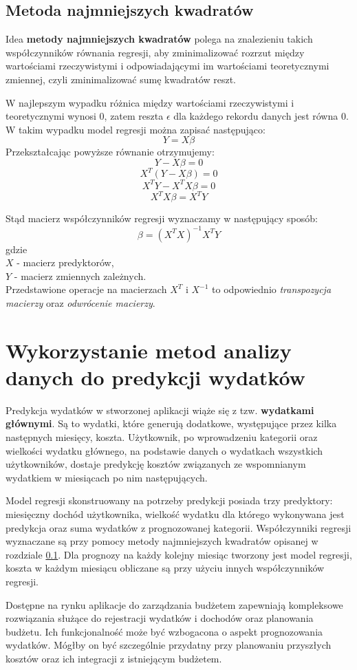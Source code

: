\subsection{Metoda najmniejszych kwadratów}\label{najmniejsze_kwadraty}
Idea \textbf{metody najmniejszych kwadratów} polega na znalezieniu takich współczynników równania regresji, aby zminimalizować rozrzut między wartościami rzeczywistymi i odpowiadającymi im wartościami teoretycznymi zmiennej, czyli zminimalizować sumę kwadratów reszt.\cite{bptstatystyka}

W najlepszym wypadku różnica między wartościami rzeczywistymi i teoretycznymi wynosi 0, zatem reszta \(\epsilon\) dla każdego rekordu danych jest równa 0. W takim wypadku model regresji można zapisać następująco: 
\[Y = X\beta\]
Przekształcając powyższe równanie otrzymujemy:
\[Y - X\beta = 0\]
\[X^T(Y - X\beta) = 0 \]
\[X^TY - X^TX\beta = 0 \]
\[X^TX\beta = X^TY\]

Stąd macierz współczynników regresji wyznaczamy w następujący sposób:
\[\beta = (X^TX)^{-1}X^TY\]
gdzie\\
\(X\) - macierz predyktorów,\\
\(Y\) - macierz zmiennych zależnych.\cite{martinabremer2012}\\
Przedstawione operacje na macierzach \(X^T\) i \(X^{-1}\) to odpowiednio \textit{transpozycja macierzy} oraz \textit{odwrócenie macierzy}.

\section{Wykorzystanie metod analizy danych do predykcji wydatków}
Predykcja wydatków w stworzonej aplikacji wiąże się z tzw. \textbf{wydatkami głównymi}. Są to wydatki, które generują dodatkowe, występujące przez kilka następnych miesięcy, koszta. Użytkownik, po wprowadzeniu kategorii oraz wielkości wydatku głównego, na podstawie danych o wydatkach wszystkich użytkowników, dostaje predykcję kosztów związanych ze wspomnianym wydatkiem w miesiącach po nim następujących.

Model regresji skonstruowany na potrzeby predykcji posiada trzy predyktory: miesięczny dochód użytkownika, wielkość wydatku dla którego wykonywana jest predykcja oraz suma wydatków z prognozowanej kategorii. Współczynniki regresji wyznaczane są przy pomocy metody najmniejszych kwadratów opisanej w rozdziale \ref{najmniejsze_kwadraty}. Dla prognozy na każdy kolejny miesiąc tworzony jest model regresji, koszta w każdym miesiącu obliczane są przy użyciu innych współczynników regresji.

Dostępne na rynku aplikacje do zarządzania budżetem zapewniają kompleksowe rozwiązania służące do rejestracji wydatków i dochodów oraz planowania budżetu. Ich funkcjonalność może być wzbogacona o aspekt prognozowania wydatków. Mógłby on być szczególnie przydatny przy planowaniu przyszłych kosztów oraz ich integracji z istniejącym budżetem.